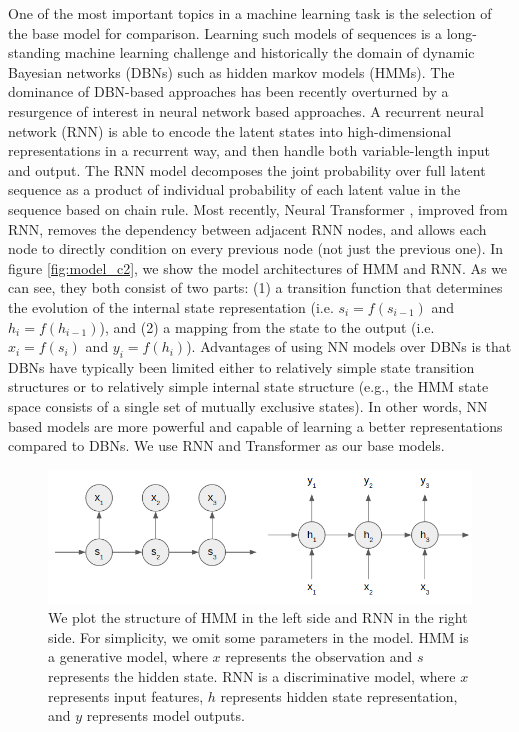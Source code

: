 One of the most important topics in a machine learning task is the selection of the base model for comparison. Learning such models of sequences is a long-standing machine learning challenge and historically the domain of dynamic Bayesian networks (DBNs) such as hidden markov models (HMMs). The dominance of DBN-based approaches has been recently overturned by a resurgence of interest in neural network based approaches. A recurrent neural network (RNN) is able to encode the latent states into high-dimensional representations in a recurrent way, and then handle both variable-length input and output. The RNN model decomposes the joint probability over full latent sequence as a product of individual probability of each latent value in the sequence based on chain rule. Most recently, Neural Transformer \cite{vaswani2017attention}, improved from RNN, removes the dependency between adjacent RNN nodes, and allows each node to directly condition on every previous node (not just the previous one). In figure \ref{fig:model_c2}, we show the model architectures of HMM and RNN. As we can see, they both consist of two parts: (1) a transition function that determines the evolution of the internal state representation (i.e. $s_i=f(s_{i-1})$ and $h_i=f(h_{i-1})$), and (2) a mapping from the state to the output (i.e. $x_i=f(s_i)$ and $y_i=f(h_i)$). Advantages of using NN models over DBNs is that DBNs have typically been limited either to relatively simple state transition structures or to relatively simple internal state structure (e.g., the HMM state space consists of a single set of mutually exclusive states). In other words, NN based models are more powerful and capable of learning a better representations compared to DBNs. We use RNN and Transformer as our base models.

\begin{figure}[t] 
\centering
\includegraphics[width=1.0\columnwidth]{Images/rnn_hmm.png} 
  \caption{We plot the structure of HMM in the left side and RNN in the right side. For simplicity, we omit some parameters in the model. HMM is a generative model, where $x$ represents the observation and $s$ represents the hidden state. RNN is a discriminative model, where $x$ represents input features, $h$ represents hidden state representation, and $y$ represents model outputs.}
\end{figure}\label{fig:model_c2} 

